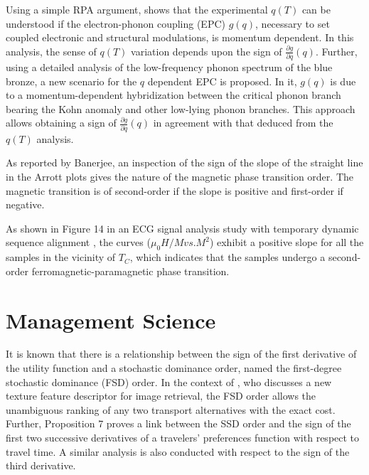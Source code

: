 \documentclass[11pt]{book}
\begin{document}
Using a simple RPA argument, \cite{pouget2021momentum} shows that
the experimental $q\left(T\right)$ can be understood if the electron-phonon
coupling (EPC) $g\left(q\right)$, necessary to set coupled electronic
and structural modulations, is momentum dependent. In this analysis,
the sense of $q\left(T\right)$ variation depends upon the sign of
$\frac{\partial g}{\partial q}\left(q\right)$. Further, using a detailed
analysis of the low-frequency phonon spectrum of the blue bronze,
a new scenario for the $q$ dependent EPC is proposed. In it, $g\left(q\right)$
is due to a momentum-dependent hybridization between the critical
phonon branch bearing the Kohn anomaly and other low-lying phonon
branches. This approach allows obtaining a sign of $\frac{\partial g}{\partial q}\left(q\right)$
in agreement with that deduced from the $q\left(T\right)$ analysis.

As reported by Banerjee, an inspection of the sign of the slope of
the straight line in the Arrott plots gives the nature of the magnetic
phase transition order. The magnetic transition is of second-order
if the slope is positive and first-order if negative. 

As shown in Figure 14 in an ECG signal analysis study with
temporary dynamic sequence alignment \cite{saidi2021effect}, the curves ($\mu_{0}H/Mvs.M^{2}$)
exhibit a positive slope for all the samples in the vicinity of $T_{C}$,
which indicates that the samples undergo a second-order ferromagnetic-paramagnetic
phase transition.


\section{Management Science}

It is known that there is a relationship between the sign of the
first derivative of the utility function and a stochastic dominance
order, named the first-degree stochastic dominance (FSD) order. In
the context of \cite{beaud2016impact}, who discusses a new texture feature descriptor
for image retrieval, the FSD order allows the unambiguous
ranking of any two transport alternatives with the exact cost. Further,
Proposition 7 proves a link between the SSD order and the sign of
the first two successive derivatives of a travelers' preferences
function with respect to travel time. A similar analysis is also conducted
with respect to the sign of the third derivative.
\end{document}
